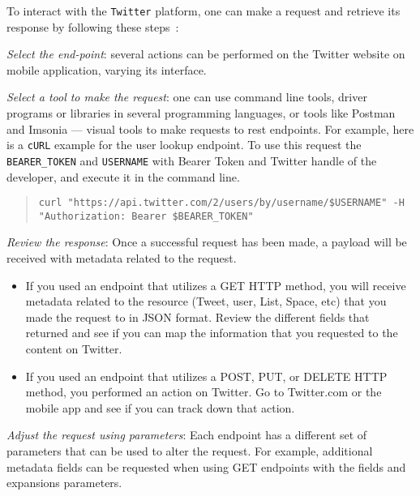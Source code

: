 To interact with the \texttt{Twitter} platform, one can make a request and
retrieve its response by following these steps~\cite{twitterAPIMakeFirstRequest}:
\begin{enum-c}
\item \emph{Select the end-point}: several actions can be performed on the
  Twitter website on mobile application, varying its interface.
\item \emph{Select a tool to make the request}: one can use command line tools,
  driver programs or libraries in several programming languages, or tools like
  Postman and Imsonia --- visual tools to make requests to \gls{rest} endpoints.
%
  For example, here is a \texttt{cURL} example for the user lookup endpoint.
  To use this request the \texttt{BEARER\_TOKEN} and \texttt{USERNAME} with
  Bearer Token and Twitter handle of the developer, and execute it in the
  command line.
  \begin{quote}
      \onehalfspacing
\begin{verbatim}
curl "https://api.twitter.com/2/users/by/username/$USERNAME" -H 
"Authorization: Bearer $BEARER_TOKEN"
\end{verbatim}
  \end{quote}
    \vspace{-2mm}
\item \emph{Review the response}:
  Once a successful request has been made, a payload will be received with
  metadata related to the request.
  \begin{itemize}
  \item 
  If you used an endpoint that utilizes a GET HTTP method, you will receive
  metadata related to the resource (Tweet, user, List, Space, etc) that you made
  the request to in JSON format. Review the different fields that returned and
  see if you can map the information that you requested to the content on
  Twitter.
\item 
If you used an endpoint that utilizes a POST, PUT, or DELETE HTTP method, you performed an action on Twitter. Go to Twitter.com or the mobile app and see if you can track down that action. 
  \end{itemize}
%
\item \emph{Adjust the request using parameters}:
  Each endpoint has a different set of parameters that can be used to alter the
  request. For example, additional metadata fields can be requested when using
  GET endpoints with the fields and expansions parameters.
\end{enum-c}

